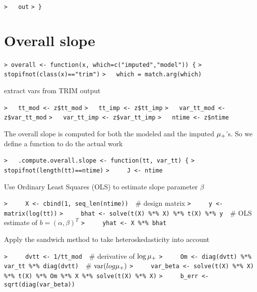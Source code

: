 \documentclass[a4paper]{article}
\begin{document}
\verb~>   out~\newline
\verb~> }~\par




\section{Overall slope}\par

\verb~> overall <- function(x, which=c("imputed","model")) {~\newline
\verb~>   stopifnot(class(x)=="trim")~\newline
\verb~>   which = match.arg(which)~\par

extract vars from TRIM output\par
\verb~>   tt_mod <- z$tt_mod~\newline
\verb~>   tt_imp <- z$tt_imp~\newline
\verb~>   var_tt_mod <- z$var_tt_mod~\newline
\verb~>   var_tt_imp <- z$var_tt_imp~\newline
\verb~>   ntime <- z$ntime~\par

The overall slope is computed for both the modeled and the imputed ${\mu_{+}}$'s.
So we define a function to do the actual work\par

\verb~>   .compute.overall.slope <- function(tt, var_tt) {~\newline
\verb~>     stopifnot(length(tt)==ntime)~\newline
\verb~>     J <- ntime~\par

Use Ordinary Least Squares (OLS) to estimate slope parameter $\beta$\par
\verb~>     X <- cbind(1, seq_len(ntime))  ~{\sffamily\# design matrix}\newline
\verb~>     y <- matrix(log(tt))~\newline
\verb~>     bhat <- solve(t(X) %*% X) %*% t(X) %*% y  ~{\sffamily\# OLS estimate of $b = (\alpha,\beta)^T$}\newline
\verb~>     yhat <- X %*% bhat~\par

Apply the sandwich method to take heteroskedasticity into account\par
\verb~>     dvtt <- 1/tt_mod  ~{\sffamily\# derivative of $\log{{\mu_{+}}}$}\newline
\verb~>     Om <- diag(dvtt) %*% var_tt %*% diag(dvtt)  ~{\sffamily\# $\operatorname{var}(log{{\mu_{+}}})$}\newline
\verb~>     var_beta <- solve(t(X) %*% X) %*% t(X) %*% Om %*% X %*% solve(t(X) %*% X)~\newline
\verb~>     b_err <- sqrt(diag(var_beta))~\par
\end{document}
